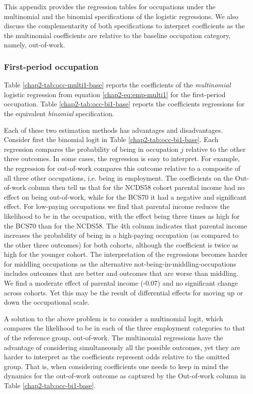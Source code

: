 This appendix provides the regression tables for occupations under the multinomial and the binomial specifications of the logistic regressions. We also discuss the complementarity of both specifications to interpret coefficients as the the multinomial coefficients are relative to the baseline occupation category, namely, out-of-work.

\subsubsection{First-period occupation}

Table \ref{chap2-tab:occ-multi1-base} reports the coefficients of the \emph{multinomial} logistic regression from equation \eqref{chap2-eq:emp-multi1} for the first-period occupation. Table \ref{chap2-tab:occ-bi1-base} reports the coefficients regressions for the equivalent \emph{binomial} specification.

Each of these two estimation methods has advantages and disadvantages. Consider first the binomial logit in Table \ref{chap2-tab:occ-bi1-base}. Each regression compares the probability of being in occupation $j$ relative to the other three outcomes. In some cases, the regression is easy to interpret. For example, the regression for out-of-work compares this outcome relative to a composite of all three other occupations, i.e. being in employment. The coefficients on the Out-of-work column then tell us that for the NCDS58 cohort parental income had no effect on being out-of-work, while for the BCS70 it had a negative and significant effect. For low-paying occupations we find that parental income reduces the likelihood to be in the occupation, with the effect being three times as high for the BCS70 than for the NCDS58. The 4th column indicates that parental income increases the probability of being in a high-paying occupation (as compared to the other three outcomes) for both cohorts, although the coefficient is twice as high for the younger cohort. The interpretation of the regressions becomes harder for middling occupations as the alternative not-being-in-middling-occupations includes outcomes that are better and outcomes that are worse than middling. We find a moderate effect of parental income (-0.07) and no significant change across cohorts. Yet this may be the result of differential effects for moving up or down the occupational scale.

A solution to the above problem is to consider a multinomial logit, which compares the likelihood to be in each of the three employment categories to that of the reference group, out-of-work. The multinomial regressions have the advantage of considering simultaneously all the possible outcomes, yet they are harder to interpret as the coefficients represent odds relative to the omitted group. That is, when considering coefficients one needs to keep in mind the dynamics for the out-of-work outcome as captured by the Out-of-work column in Table \ref{chap2-tab:occ-bi1-base}. 

